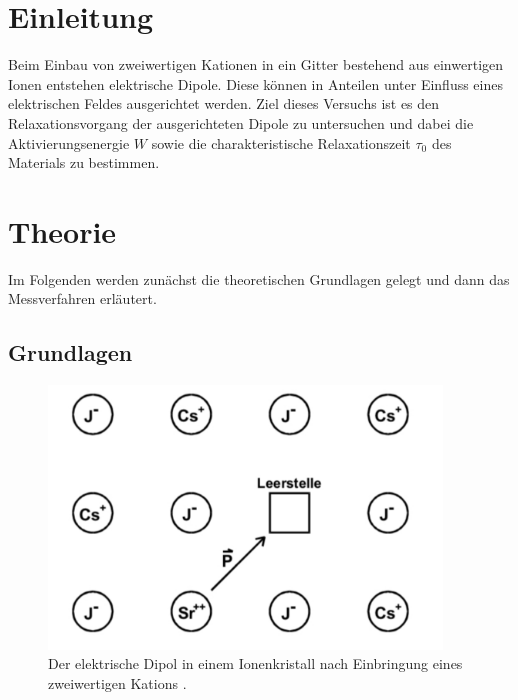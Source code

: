 \section{Einleitung}

Beim Einbau von zweiwertigen Kationen in ein Gitter bestehend aus einwertigen Ionen entstehen elektrische Dipole. Diese können in Anteilen unter Einfluss eines elektrischen Feldes ausgerichtet werden. Ziel dieses Versuchs ist es den Relaxationsvorgang der ausgerichteten Dipole zu untersuchen und dabei die Aktivierungsenergie $W$ sowie die charakteristische Relaxationszeit $\tau_0$ des Materials zu bestimmen.

\section{Theorie}
\label{sec:Theorie}

Im Folgenden werden zunächst die theoretischen Grundlagen gelegt und dann das Messverfahren erläutert.

\subsection{Grundlagen}


\begin{figure}
  \centering
  \includegraphics[height= 7cm]{BestNippelpiercings/gitter.pdf}
  \caption{Der elektrische Dipol in einem Ionenkristall nach Einbringung eines zweiwertigen Kations \cite{anleitung}.}
  \label{fig:gitter}
\end{figure}

